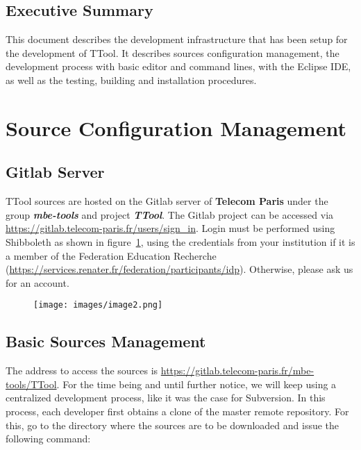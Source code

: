 \documentclass[12pt]{article}
\begin{document}
\subsection{Executive Summary}

This document describes the development infrastructure that has been setup for
the development of TTool. It describes sources configuration management, the
development process with basic editor and command lines, with the Eclipse IDE,
as well as the testing, building and installation procedures.

\newpage 

\section{Source Configuration Management}
\label{sec:scm}

\subsection{Gitlab Server}

TTool sources are hosted on the Gitlab server of \textbf{Telecom Paris} under the
group \textbf{\textit{mbe}\textit{-tools}} and project \textbf{\textit{TTool}}. The Gitlab project
can be accessed via \url{https://gitlab.telecom-paris.fr/users/sign_in}. 
Login must be performed using Shibboleth as shown in
figure~\ref{fig:image1}, using the credentials from your institution if it is a
member of the Federation Education Recherche (\url{https://services.renater.fr/federation/participants/idp}). Otherwise, please ask us for an account.

\begin{figure}[H]
\begin{center}
\texttt{[image: images/image2.png]}
\end{center}
\caption{}
\label{fig:image1}
\end{figure}
 
\subsection{Basic Sources Management}

The address to access the sources is \url{https://gitlab.telecom-paris.fr/mbe-tools/TTool}.
For the time being and until further notice, we will keep using a centralized development process, like it was the case for Subversion. In this process, each developer first obtains a clone of the master remote repository. For this, go to the directory where the sources are to be downloaded and issue the following command: \\
\end{document}
